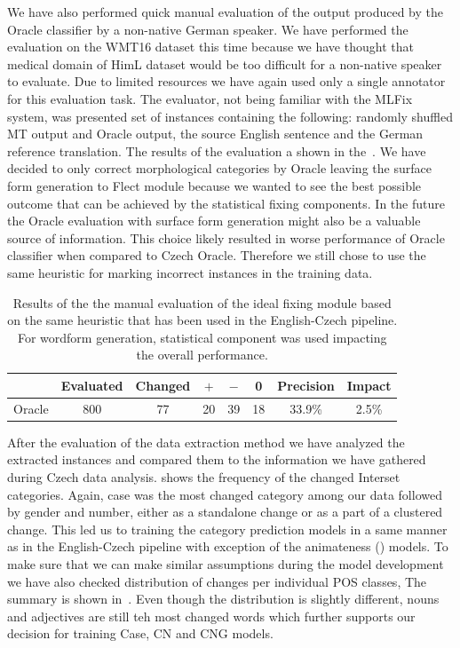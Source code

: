 We have also performed quick manual evaluation of the output produced by the Oracle classifier by a non-native
German speaker.
We have performed the evaluation on the WMT16 dataset this time because we have thought that medical domain of HimL dataset
would be too difficult for a non-native speaker to evaluate.
Due to limited
resources we have again used only a single annotator for this evaluation task. The evaluator, not being familiar
with the MLFix system, was presented set of instances containing the following: randomly shuffled MT output and Oracle output,
the source English sentence and the German reference translation. The results of the evaluation a shown in the~.
We have decided to only correct morphological categories by Oracle leaving the surface form generation to Flect module because
we wanted to see the best possible outcome that can be achieved by the statistical fixing components. In the future
the Oracle evaluation with  surface form generation might also be a valuable source of information.
This choice likely resulted in worse performance of Oracle classifier when compared to Czech Oracle. Therefore
we still chose to use the same heuristic for marking incorrect instances in the training data.

\begin{table}[t]
\centering
\small

\begin{tabular}{l|cc|ccc|cc}
  &  Evaluated  &  Changed  &  $+$  &  $-$  &  0  &  Precision  &  Impact  \\
\hline
Oracle  &  800  &  77  &  20  &  39  &  18  &  33.9\%  &  2.5\%  \\
\end{tabular}
\caption{
Results of the the manual evaluation of the ideal fixing module based on the same heuristic
that has been used in the English-Czech pipeline. For wordform generation, statistical component
was used impacting the overall performance.
}
\label{oracle_de-maneval}
\end{table}

After the evaluation of the data extraction method we have analyzed the extracted instances and compared them
to the information we have gathered during Czech data analysis.  shows the frequency of the changed Interset
categories. Again, case was the most changed category among our data followed by gender and number, either as a standalone change or
as a part of a clustered change. This led us to training the category prediction models in a same manner as in the English-Czech
pipeline with exception of the animateness () models. To make sure that we can make similar assumptions during
the model development we have also checked distribution of changes per individual POS classes, The summary is shown in~.
Even though the distribution is slightly different, nouns and adjectives are still teh most changed words which further supports
our decision for training Case, CN and CNG models.

